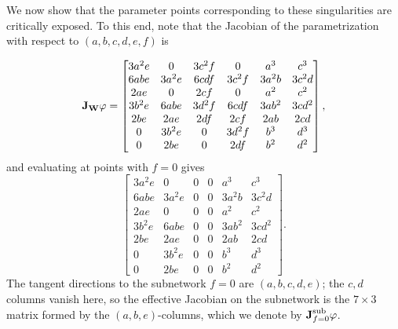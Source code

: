 \documentclass{article} %
\theoremstyle{plain}%
\theoremstyle{definition}
\theoremstyle{remark}
\newcommand{\jacob}{\textnormal{\textbf{J}}}
\begin{document}
We now show that the parameter points corresponding to these singularities are critically exposed. To this end, note that the Jacobian of the parametrization with respect to $(a,b,c,d,e,f)$ is



\begin{equation}
\jacob_\mathbf{W} \varphi=
\begin{bmatrix}
3a^2 e & 0       & 3c^2 f & 0       & a^3     & c^3 \\
6ab e  & 3a^2 e  & 6cd f  & 3c^2 f  & 3a^2 b  & 3c^2 d \\
2a e   & 0       & 2c f   & 0       & a^2     & c^2 \\
3b^2 e & 6ab e   & 3d^2 f & 6cd f   & 3ab^2   & 3cd^2 \\
2b e   & 2a e    & 2d f   & 2c f    & 2ab     & 2cd \\
0      & 3b^2 e  & 0      & 3d^2 f  & b^3     & d^3 \\
0      & 2b e    & 0      & 2d f    & b^2     & d^2
\end{bmatrix},
\end{equation}
and evaluating at points with $f=0$ gives
\begin{equation}
\begin{bmatrix}
3a^2 e & 0       & 0 & 0 & a^3   & c^3 \\
6ab e  & 3a^2 e  & 0 & 0 & 3a^2 b& 3c^2 d \\
2a e   & 0       & 0 & 0 & a^2   & c^2 \\
3b^2 e & 6ab e   & 0 & 0 & 3ab^2 & 3cd^2 \\
2b e   & 2a e    & 0 & 0 & 2ab   & 2cd \\
0      & 3b^2 e  & 0 & 0 & b^3   & d^3 \\
0      & 2b e    & 0 & 0 & b^2   & d^2
\end{bmatrix}.
\end{equation}
The tangent directions to the subnetwork $f=0$ are $(a,b,c,d,e)$; the $c,d$
columns vanish here, so the effective Jacobian on the subnetwork is the
$7\times 3$ matrix formed by the $(a,b,e)$-columns, which we denote by $\jacob_{f=0}^{\mathrm{sub}}\varphi$. 
\end{document}
